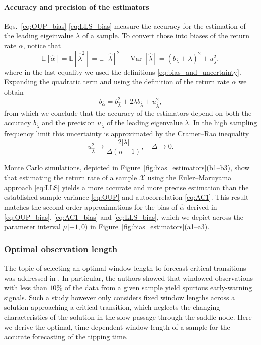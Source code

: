 \documentclass[openacc]{rsproca_new}
\newcommand{\Var}{\operatorname{Var}}
\newcommand{\E}{\mathbb{E}}
\begin{document}
\paragraph{Accuracy and precision of the estimators}
Eqs.~\eqref{eq:OUP_bias}-\eqref{eq:LLS_bias} measure the accuracy for the estimation of the leading eigeinvalue $\lambda$ of a sample. To convert those into biases of the return rate $\alpha$, notice that
%
\begin{equation}
  \E[\hat\alpha] = \E[\hat\lambda^2] = \E[\hat\lambda]^2 + \Var[\hat\lambda] = (b_{\hat\lambda} + \lambda)^2 + u^2_{\hat\lambda} ,
\end{equation}
%
where in the last equality we used the definitions \eqref{eq:bias_and_uncertainty}.
Expanding the quadratic term and using the definition of the return rate $\alpha$ we obtain
%
\begin{equation}\label{eq:return_rate_bias}
  b_{\hat\alpha} = b^2_{\hat\lambda} + 2\lambda b_{\hat\lambda} + u^2_{\hat\lambda},
\end{equation}
%
from which we conclude that the accuracy of the estimators depend on both the accuracy $b_{\hat\lambda}$  and the precision $u_{\hat\lambda}$ of the leading eigenvalue $\lambda$.
In the high sampling frequency limit this uncertainty is approximated by the Cramer--Rao inequality \cite[Thm.~$7.3.9$]{Casella2024} 
%
\begin{equation}\label{eq:cramer_rao_bound}
  u_{\hat\lambda}^2 \to \frac{2|\lambda|}{\Delta(n-1)},\quad\Delta\to 0. 
\end{equation}

Monte Carlo simulations, depicted in Figure~\ref{fig:bias_estimators}(b1--b3), show that estimating the return rate of a sample $\mathcal{X}$ using the Euler--Maruyama approach \eqref{eq:LLS} yields a more accurate and more precise estimation than the established sample variance \eqref{eq:OUP} and autocorrelation \eqref{eq:AC1}.
This result matches the second order approximations for the bias of $\hat\alpha$ derived in \eqref{eq:OUP_bias}, \eqref{eq:AC1_bias} and \eqref{eq:LLS_bias}, which we depict across the parameter interval $\mu[-1,0)$ in Figure~\ref{fig:bias_estimators}(a1--a3).

\subsubsection{Optimal observation length}\label{subsubsec:window}
The topic of selecting an optimal window length to forecast critical transitions was addressed in \cite{Chen2022}.
In particular, the authors showed that windowed observations with less than $10\%$ of the data from a given sample yield spurious early-warning signals.
Such a study however only considers fixed window lengths across a solution approaching a critical transition, which neglects the changing characteristics of the solution in the slow passage through the saddle-node.
Here we derive the optimal, time-dependent window length of a sample for the accurate forecasting of the tipping time.
\end{document}
